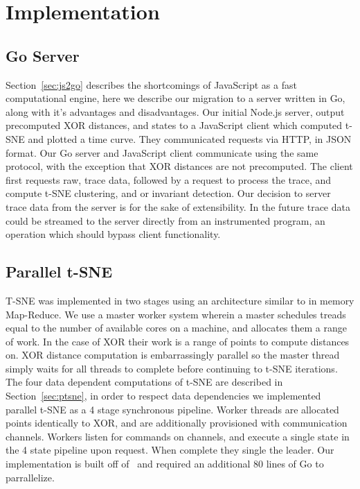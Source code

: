 \section{Implementation}
\label{sec:imp}

\subsection{Go Server}
Section~\ref{sec:js2go} describes the shortcomings of JavaScript as a
fast computational engine, here we describe our migration to a server
written in Go, along with it's advantages and disadvantages. Our
initial Node.js server, output precomputed XOR distances, and states
to a JavaScript client which computed t-SNE and plotted a time curve.
They communicated requests via HTTP, in JSON format. Our Go server and
JavaScript client communicate using the same protocol, with the
exception that XOR distances are not precomputed. The client first
requests raw, trace data, followed by a request to process the trace,
and compute t-SNE clustering, and or invariant detection. Our
decision to server trace data from the server is for the sake of
extensibility. In the future trace data could be streamed to the
server directly from an instrumented program, an operation which
should bypass client functionality.

\subsection{Parallel t-SNE}
T-SNE was implemented in two stages using an architecture similar to
in memory Map-Reduce. We use a master worker system wherein a master
schedules treads equal to the number of available cores on a machine,
and allocates them a range of work. In the case of XOR their work is a
range of points to compute distances on. XOR distance computation is
embarrassingly parallel so the master thread simply waits for all
threads to complete before continuing to t-SNE iterations.
%
The four data dependent computations of t-SNE are described in
Section~\ref{sec:ptsne}, in order to respect data dependencies we
implemented parallel t-SNE as a 4 stage synchronous pipeline. Worker
threads are allocated points identically to XOR, and are additionally
provisioned with communication channels. Workers listen for commands
on channels, and execute a single state in the 4 state pipeline upon
request. When complete they single the leader.
%
Our implementation is built off of~\cite{tsne4go} and required an
additional 80 lines of Go to parrallelize.


